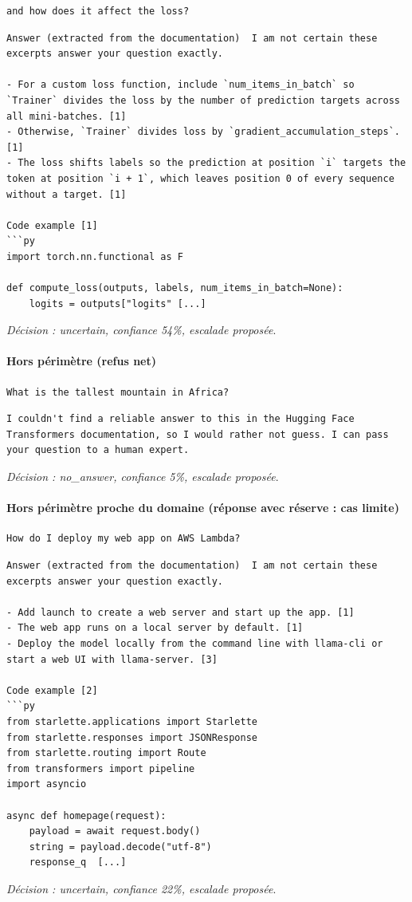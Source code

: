 \begin{lstlisting}
and how does it affect the loss?
\end{lstlisting}
\begin{lstlisting}[backgroundcolor=\color{black!5}]
Answer (extracted from the documentation)  I am not certain these excerpts answer your question exactly.

- For a custom loss function, include `num_items_in_batch` so `Trainer` divides the loss by the number of prediction targets across all mini-batches. [1]
- Otherwise, `Trainer` divides loss by `gradient_accumulation_steps`. [1]
- The loss shifts labels so the prediction at position `i` targets the token at position `i + 1`, which leaves position 0 of every sequence without a target. [1]

Code example [1]
```py
import torch.nn.functional as F

def compute_loss(outputs, labels, num_items_in_batch=None):
    logits = outputs["logits" [...]
\end{lstlisting}
\noindent\textit{Décision : uncertain, confiance 54\%, escalade proposée}.

\paragraph{Hors périmètre (refus net)}
\begin{lstlisting}
What is the tallest mountain in Africa?
\end{lstlisting}
\begin{lstlisting}[backgroundcolor=\color{black!5}]
I couldn't find a reliable answer to this in the Hugging Face Transformers documentation, so I would rather not guess. I can pass your question to a human expert.
\end{lstlisting}
\noindent\textit{Décision : no\_answer, confiance 5\%, escalade proposée}.

\paragraph{Hors périmètre proche du domaine (réponse avec réserve : cas limite)}
\begin{lstlisting}
How do I deploy my web app on AWS Lambda?
\end{lstlisting}
\begin{lstlisting}[backgroundcolor=\color{black!5}]
Answer (extracted from the documentation)  I am not certain these excerpts answer your question exactly.

- Add launch to create a web server and start up the app. [1]
- The web app runs on a local server by default. [1]
- Deploy the model locally from the command line with llama-cli or start a web UI with llama-server. [3]

Code example [2]
```py
from starlette.applications import Starlette
from starlette.responses import JSONResponse
from starlette.routing import Route
from transformers import pipeline
import asyncio

async def homepage(request):
    payload = await request.body()
    string = payload.decode("utf-8")
    response_q  [...]
\end{lstlisting}
\noindent\textit{Décision : uncertain, confiance 22\%, escalade proposée}.

